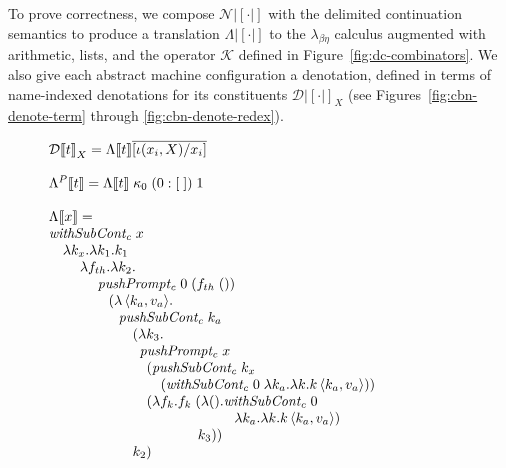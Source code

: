 \documentclass{LMCS}
\newenvironment{boxedarray}[1]
  {\begin{lrbox}{\saveboxedarray}\begin{math}\begin{array}{#1}}
  {\end{array}\end{math}\end{lrbox}\fbox{\usebox{\saveboxedarray}}}
\theoremstyle{plain}
\theoremstyle{remark}
\begin{document}
To prove correctness, we compose $\mathcal{N}|[\cdot|]$ with the delimited
continuation semantics to produce a translation $\Lambda |[\cdot|]$ to the
$\lambda_{\beta\eta}$ calculus augmented with arithmetic, lists, and the
operator $\mathcal{K}$ defined in Figure~\ref{fig:dc-combinators}.  We also
give each abstract machine configuration a denotation, defined in terms of
name-indexed denotations for its constituents $\mathcal{D}|[\cdot|]_X$ (see
Figures~\ref{fig:cbn-denote-term} through \ref{fig:cbn-denote-redex}).



\begin{figure}[ht]
  \centering\small
  \begin{boxedarray}{@{}l@{}}

    \mathcal{D}|[ t |]_X  =
    \Lambda |[ t |]\overline{[\iota(x_i,X)/x_i]}  \\ \\

      \Lambda^P |[ t|] =
      \Lambda |[t|]\; \kappa_0 \; (0:[\;])\; 1 \\ \\

      \Lambda |[ x |]  =  \\
      \begin{array}[t]{@{}l@{}}
\mathit{withSubCont_c}\;x \\
\quad \lambda k_x.\lambda k_1.k_1  \\
\quad\quad\: \lambda f_{th}.\lambda k_2. \\
\qquad\quad\;\: \mathit{pushPrompt_c}\; 0\; (f_{th}\;()) \\
\qquad\qquad\;(\lambda \Braket{k_a,v_a}\!.\\
\qquad\qquad\quad \mathit{pushSubCont_c}\; k_a \\
\qquad\qquad\qquad(\lambda k_3.\\
\qquad\qquad\qquad\;\:\mathit{pushPrompt_c}\; x \\
\qquad\qquad\qquad\quad(\mathit{pushSubCont_c}\; k_x \\
\qquad\qquad\qquad\qquad(\mathit{withSubCont_c}\; 0\; 
\lambda k_a. \lambda k. k \Braket{k_a, v_a})) \\
\qquad\qquad\qquad\quad(\lambda f_k.f_k\;
 (\lambda ().\mathit{withSubCont_c}\; 0\; \\
\qquad\qquad\qquad\qquad\qquad\qquad\quad\;
 \lambda k_a.\lambda k. k \Braket{k_a, v_a}) \\
\qquad\qquad\qquad\quad\qquad\qquad\!\!k_3)) \\
\qquad\qquad\qquad k_2) \\
      \end{array}  \\ \\


\end{boxedarray}
\end{figure}
\end{document}
